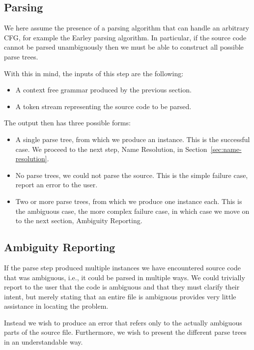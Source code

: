 \documentclass{kththesis}
\begin{document}
\subsection{Parsing} \label{sec:formalization-parsing}

We here assume the presence of a parsing algorithm that can handle an arbitrary CFG, for example the Earley \cite{Earley1970An-Efficient-Co} parsing algorithm. In particular, if the source code cannot be parsed unambiguously then we must be able to construct all possible parse trees.

With this in mind, the inputs of this step are the following:

\begin{itemize}
  \item A context free grammar produced by the previous section.
  \item A token stream representing the source code to be parsed.
\end{itemize}

The output then has three possible forms:

\begin{itemize}
  \item A single parse tree, from which we produce an instance. This is the successful case. We proceed to the next step, Name Resolution, in Section~\ref{sec:name-resolution}.
  \item No parse trees, we could not parse the source. This is the simple failure case, report an error to the user.
  \item Two or more parse trees, from which we produce one instance each. This is the ambiguous case, the more complex failure case, in which case we move on to the next section, Ambiguity Reporting.
\end{itemize}

\subsection{Ambiguity Reporting} \label{sec:implementation-ambiguity-detection}

If the parse step produced multiple instances we have encountered source code that was ambiguous, i.e., it could be parsed in multiple ways. We could trivially report to the user that the code is ambiguous and that they must clarify their intent, but merely stating that an entire file is ambiguous provides very little assistance in locating the problem.

Instead we wish to produce an error that refers only to the actually ambiguous parts of the source file. Furthermore, we wish to present the different parse trees in an understandable way.
\end{document}
